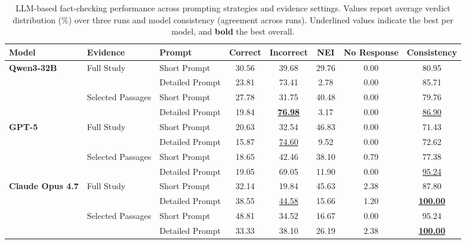 \documentclass[11pt]{article}
\begin{document}
\begin{table}[t]
\centering
\small
\setlength{\tabcolsep}{4pt}
\begin{tabular}{ll l cccc c}
\hline
\textbf{Model} & \textbf{Evidence} & \textbf{Prompt} & \textbf{Correct} & \textbf{Incorrect} & \textbf{NEI} & \textbf{No Response} & \textbf{Consistency} \\
\hline

\multirow{4}{*}{\textbf{Qwen3-32B}} 
& \multirow{2}{*}{Full Study} 
& Short Prompt    & 30.56 & 39.68 & 29.76 & 0.00 & 80.95 \\
& 
& Detailed Prompt & 23.81 & 73.41 & 2.78  & 0.00 & 85.71 \\
& \multirow{2}{*}{Selected Passages} 
& Short Prompt    & 27.78 & 31.75 & 40.48 & 0.00 & 79.76 \\
& 
& Detailed Prompt & 19.84 & \underline{\textbf{76.98}} & 3.17  & 0.00 & \underline{86.90} \\
\hline

\multirow{4}{*}{\textbf{GPT-5}} 
& \multirow{2}{*}{Full Study} 
& Short Prompt    & 20.63 & 32.54 & 46.83 & 0.00 & 71.43 \\
& 
& Detailed Prompt & 15.87 & \underline{74.60} & 9.52  & 0.00 & 72.62 \\
& \multirow{2}{*}{Selected Passages} 
& Short Prompt    & 18.65 & 42.46 & 38.10 & 0.79 & 77.38 \\
& 
& Detailed Prompt & 19.05 & 69.05 & 11.90 & 0.00 & \underline{95.24} \\
\hline

\multirow{4}{*}{\textbf{Claude Opus 4.7}} 
& \multirow{2}{*}{Full Study} 
& Short Prompt    & 32.14 & 19.84 & 45.63 & 2.38 & 87.80 \\
& 
& Detailed Prompt & 38.55 & \underline{44.58} & 15.66 & 1.20 & \underline{\textbf{100.00}} \\
& \multirow{2}{*}{Selected Passages} 
& Short Prompt    & 48.81 & 34.52 & 16.67 & 0.00 & 95.24 \\
& 
& Detailed Prompt & 33.33 & 38.10 & 26.19 & 2.38 & \underline{\textbf{100.00}} \\
\hline

\end{tabular}
\caption{LLM-based fact-checking performance across prompting strategies and evidence settings.
Values report average verdict distribution (\%) over three runs and model consistency (agreement across runs).
Underlined values indicate the best per model, and \textbf{bold} the best overall.}

\label{tab:combined_results}
\end{table}
\end{document}
